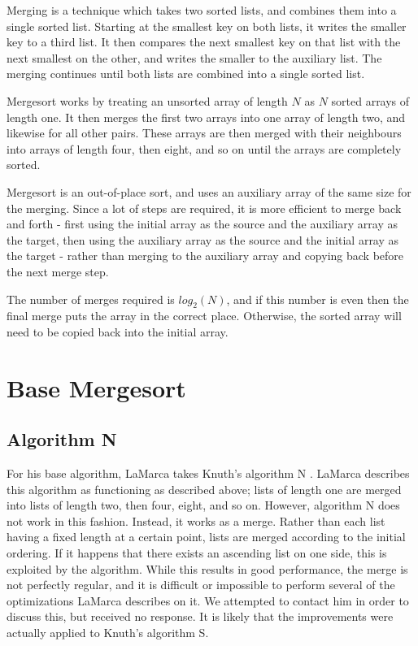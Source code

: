 \label{merge}
Merging is a technique which takes two sorted lists, and combines them into a
single sorted list. Starting at the smallest key on both lists, it writes the
smaller key to a third list. It then compares the next smallest key on that list
with the next smallest on the other, and writes the smaller to the auxiliary
list. The merging continues until both lists are combined into a single sorted
list.

Mergesort works by treating an unsorted array of length $N$ as $N$ sorted arrays of
length one. It then merges the first two arrays into one array of length two, and
likewise for all other pairs. These arrays are then merged with their neighbours
into arrays of length four, then eight, and so on until the arrays are
completely sorted.

Mergesort is an out-of-place sort, and uses an auxiliary array of the same size
for the merging. Since a lot of steps are required, it is more efficient to
merge back and forth - first using the initial array as the source and the
auxiliary array as the target, then using the auxiliary array as the source and
the initial array as the target - rather than merging to the auxiliary array and
copying back before the next merge step.

The number of merges required is $log_2(N)$, and if this number is even then the
final merge puts the array in the correct place. Otherwise, the sorted array
will need to be copied back into the initial array.

\section{Base Mergesort}

\subsection{Algorithm N}
\label{Algorithm N}

For his base algorithm, LaMarca takes Knuth's algorithm N \cite{Knuth98}.
LaMarca describes this algorithm as functioning as described above; lists of
length one are merged into lists of length two, then four, eight, and so on.
However, algorithm N does not work in this fashion. Instead, it works as a
 merge. Rather than each list having a fixed length at a certain
point, lists are merged according to the initial ordering. If it happens that
there exists an ascending list on one side, this is exploited by the algorithm.
While this results in good performance, the merge is not perfectly regular, and
it is difficult or impossible to perform several of the optimizations LaMarca
describes on it. We attempted to contact him in order to discuss this, but
received no response. It is likely that the improvements were actually applied
to Knuth's algorithm S.

